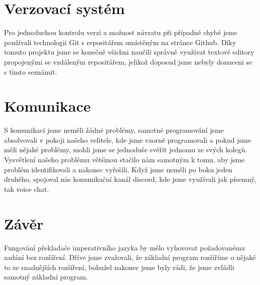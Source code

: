 \documentclass[a4paper, 11pt]{article}
\begin{document}

\section{Verzovací systém}
Pro jednoduchou kontrolu verzí a možnost návratu při případné chybě jsme používali technologii Git s repositářem umístěným na stránce Github. Díky tomuto projektu jsme se konečně všichni naučili správně využívat textové editory propojenými se vzdáleným repositářem, jelikož doposud jsme nebyly donuceni se s tímto seznámit.


\section{Komunikace}
S komunikací jsme neměli žádné problémy, samotné programování jsme absolvovali v pokoji našeho velitele, kde jsme vzorně programovali a pokud jsme měli nějaké problémy, mohli jsme se jednoduše svěřit jednomu ze svých kolegů. Vysvětlení našeho problému většinou stačilo nám samotným k tomu, aby jsme problém identifikovali a nakonec vyřešili. Když jsme neměli po boku jeden druhého, spojoval nás komunikační kanál discord, kde jsme využívali jak písemný, tak voice chat.


\section{Závěr}
Fungování překladače imperativního jazyka by mělo vyhovovat požadovanému zadání bez rozšíření. Dříve jsme zvažovali, že základní program rozšíříme o nějaké to ze snadnějších rozšíření, bohužel nakonec jsme byly rádi, že jsme zvládli samotný základní program.



\newpage
\end{document}

